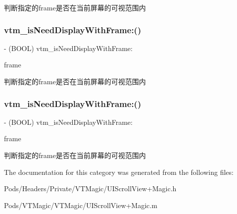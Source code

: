 判断指定的frame是否在当前屏幕的可视范围内 \mbox{\label{category_u_i_scroll_view_07_magic_08_a386f3ae8fad7768de76b7d3ac1ffd6a7}} 
\subsubsection{\texorpdfstring{vtm\+\_\+is\+Need\+Display\+With\+Frame\+:()}{vtm\_isNeedDisplayWithFrame:()}\hspace{0.1cm}{\footnotesize\ttfamily [2/3]}}
{\footnotesize\ttfamily -\/ (B\+O\+OL) vtm\+\_\+is\+Need\+Display\+With\+Frame\+: \begin{DoxyParamCaption}\item[{(C\+G\+Rect)}]{frame }\end{DoxyParamCaption}}

判断指定的frame是否在当前屏幕的可视范围内 \mbox{\label{category_u_i_scroll_view_07_magic_08_a386f3ae8fad7768de76b7d3ac1ffd6a7}} 
\subsubsection{\texorpdfstring{vtm\+\_\+is\+Need\+Display\+With\+Frame\+:()}{vtm\_isNeedDisplayWithFrame:()}\hspace{0.1cm}{\footnotesize\ttfamily [3/3]}}
{\footnotesize\ttfamily -\/ (B\+O\+OL) vtm\+\_\+is\+Need\+Display\+With\+Frame\+: \begin{DoxyParamCaption}\item[{(C\+G\+Rect)}]{frame }\end{DoxyParamCaption}}

判断指定的frame是否在当前屏幕的可视范围内 

The documentation for this category was generated from the following files\+:\begin{DoxyCompactItemize}
\item 
Pods/\+Headers/\+Private/\+V\+T\+Magic/U\+I\+Scroll\+View+\+Magic.\+h\item 
Pods/\+V\+T\+Magic/\+V\+T\+Magic/U\+I\+Scroll\+View+\+Magic.\+m\end{DoxyCompactItemize}
